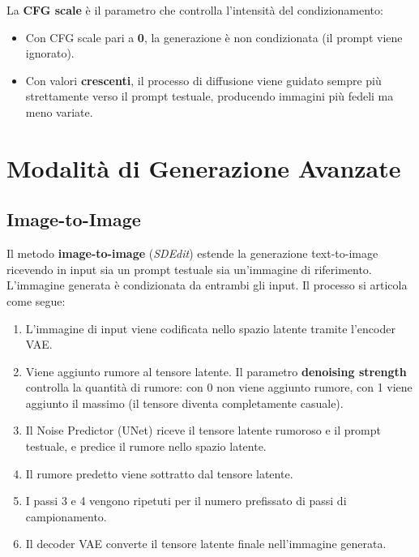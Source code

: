La \textbf{CFG scale} è il parametro che controlla l'intensità del
condizionamento:
\begin{itemize}
  \item Con CFG scale pari a \textbf{0}, la generazione è non
        condizionata (il prompt viene ignorato).
  \item Con valori \textbf{crescenti}, il processo di diffusione
        viene guidato sempre più strettamente verso il prompt testuale,
        producendo immagini più fedeli ma meno variate.
\end{itemize}

\section{Modalità di Generazione Avanzate}
\label{sec:advanced-modes}

\subsection{Image-to-Image}
\label{subsec:img2img}

Il metodo \textbf{image-to-image} (\emph{SDEdit}) estende la generazione
text-to-image ricevendo in input sia un prompt testuale sia un'immagine
di riferimento. L'immagine generata è condizionata da entrambi gli input.
Il processo si articola come segue:

\begin{enumerate}
  \item L'immagine di input viene codificata nello spazio latente
        tramite l'encoder VAE.
  \item Viene aggiunto rumore al tensore latente. Il parametro
        \textbf{denoising strength} controlla la quantità di rumore:
        con 0 non viene aggiunto rumore, con 1 viene aggiunto il
        massimo (il tensore diventa completamente casuale).
  \item Il Noise Predictor (UNet) riceve il tensore latente rumoroso
        e il prompt testuale, e predice il rumore nello spazio latente.
  \item Il rumore predetto viene sottratto dal tensore latente.
  \item I passi 3 e 4 vengono ripetuti per il numero prefissato di
        passi di campionamento.
  \item Il decoder VAE converte il tensore latente finale nell'immagine
        generata.
\end{enumerate}

